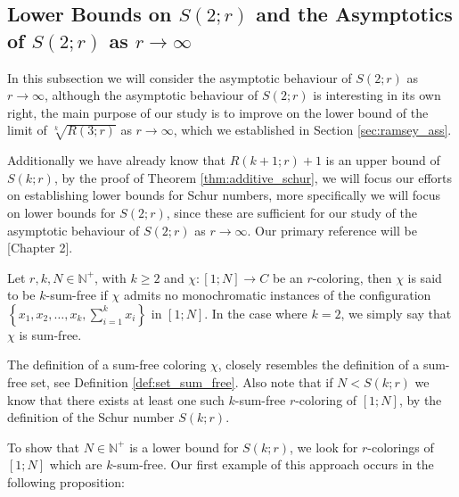 \subsection{Lower Bounds on $S(2; r)$ and the Asymptotics of $S(2; r)$ as $r \to \infty$}\label{sub:schur_bounds_and_ass}
In this subsection we will consider the asymptotic behaviour of $S(2; r)$ as $r \to \infty$, although the asymptotic behaviour of $S(2; r)$ is interesting in its own right, the main purpose of our study is to improve on the lower bound of the limit of $\sqrt[k]{R(3; r)}$ as $r \to \infty$, which we established in Section \ref{sec:ramsey_ass}.

Additionally we have already know that $R(k + 1; r) + 1$ is an upper bound of $S(k; r)$, by the proof of Theorem \ref{thm:additive_schur}, we will focus our efforts on establishing lower bounds for Schur numbers, more specifically we will focus on lower bounds for $S(2; r)$, since these are sufficient for our study of the asymptotic behaviour of $S(2; r)$ as $r \to \infty$. Our primary reference will be \cite{emogrt}[Chapter 2].
\begin{definition}
	Let $r, k, N \in \mathbb{N}^+$, with $k \geq 2$ and $\chi: [1; N] \to C$ be an $r$-coloring, then $\chi$ is said to be $k$-sum-free if $\chi$ admits no monochromatic instances of the configuration $\left\{x_1, x_2, \ldots, x_{k}, \sum_{i = 1}^k x_i\right\}$ in $[1; N]$. In the case where $k = 2$, we simply say that $\chi$ is sum-free.
\end{definition}
\begin{remark}\label{rem:sum_free}
	The definition of a sum-free coloring $\chi$, closely resembles the definition of a sum-free set, see Definition \ref{def:set_sum_free}. Also note that if $N < S(k; r)$ we know that there exists at least one such $k$-sum-free $r$-coloring of $[1; N]$, by the definition of the Schur number $S(k; r)$.
\end{remark}
To show that $N \in \mathbb{N}^{+}$ is a lower bound for $S(k; r)$, we look for $r$-colorings of $[1; N]$ which are $k$-sum-free. Our first example of this approach occurs in the following proposition:

